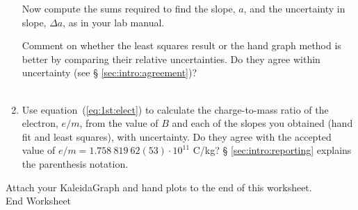 \begin{enumerate}
\noindent Now compute the sums required to find the slope, $a$, and
the uncertainty in slope, $\Delta a$, as in your lab manual. \\
\vfill
\pagebreak

\noindent Comment on whether the least squares result or the hand graph method is better by comparing their relative uncertainties. Do they agree within uncertainty (see § \ref{sec:intro:agreement})?  \\
\vspace*{4cm} \\

\item Use equation~(\ref{eq:1st:elect}) to calculate the charge-to-mass ratio
of the electron, $e/m$, from the value of $B$ and each of the slopes you obtained (hand fit and least squares), with uncertainty. Do they agree with the accepted value of $e/m=1.758~819~62(53)\cdot 10^{11}$ C/kg? § \ref{sec:intro:reporting} explains the parenthesis notation.\\ %

\end{enumerate}


\vfill
\noindent Attach your KaleidaGraph and hand plots to the end of this worksheet. \\
{\Large End Worksheet} 




\renewcommand{\thesection}{\thechapter.\arabic{section}}